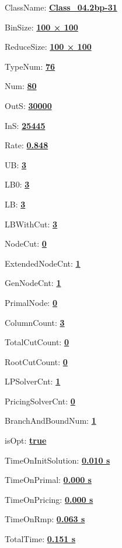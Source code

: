 \documentclass[11pt]{article}
\begin{document}
\pagestyle{empty}


ClassName: \underline{\textbf{Class_04.2bp-31}}
\par
BinSize: \underline{\textbf{100 × 100}}
\par
ReduceSize: \underline{\textbf{100 × 100}}
\par
TypeNum: \underline{\textbf{76}}
\par
Num: \underline{\textbf{80}}
\par
OutS: \underline{\textbf{30000}}
\par
InS: \underline{\textbf{25445}}
\par
Rate: \underline{\textbf{0.848}}
\par
UB: \underline{\textbf{3}}
\par
LB0: \underline{\textbf{3}}
\par
LB: \underline{\textbf{3}}
\par
LBWithCut: \underline{\textbf{3}}
\par
NodeCut: \underline{\textbf{0}}
\par
ExtendedNodeCnt: \underline{\textbf{1}}
\par
GenNodeCnt: \underline{\textbf{1}}
\par
PrimalNode: \underline{\textbf{0}}
\par
ColumnCount: \underline{\textbf{3}}
\par
TotalCutCount: \underline{\textbf{0}}
\par
RootCutCount: \underline{\textbf{0}}
\par
LPSolverCnt: \underline{\textbf{1}}
\par
PricingSolverCnt: \underline{\textbf{0}}
\par
BranchAndBoundNum: \underline{\textbf{1}}
\par
isOpt: \underline{\textbf{true}}
\par
TimeOnInitSolution: \underline{\textbf{0.010 s}}
\par
TimeOnPrimal: \underline{\textbf{0.000 s}}
\par
TimeOnPricing: \underline{\textbf{0.000 s}}
\par
TimeOnRmp: \underline{\textbf{0.063 s}}
\par
TotalTime: \underline{\textbf{0.151 s}}
\par
\newpage
\end{document}
